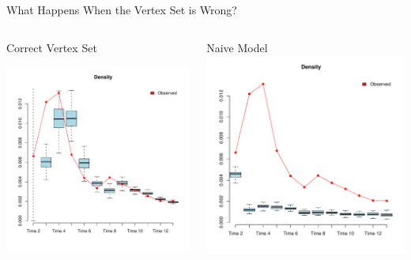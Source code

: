\documentclass[10pt]{beamer}
\begin{document}
\begin{frame}{What Happens When the Vertex Set is Wrong?}

\vspace{-.27in}
\begin{columns}
\begin{block}{\small{Correct Vertex Set}}

\includegraphics[width=.85\linewidth]{graphics/fixedVertexDensity} 
\end{block}

\begin{block}{\small{Naive Model}}
\includegraphics[width=.85\linewidth]{graphics/simpleVertexDensity}
\end{block}


\end{columns}
\end{frame}
\end{document}
